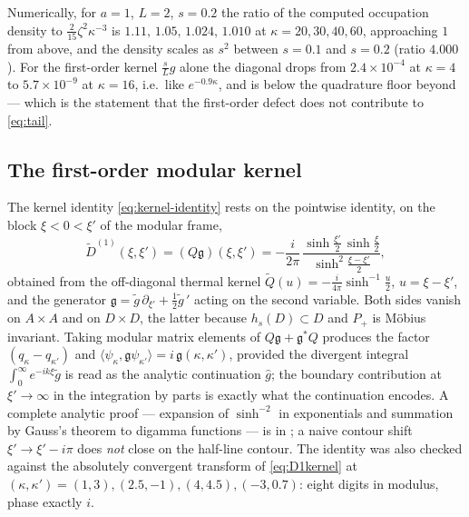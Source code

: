 Numerically, for $a=1$, $L=2$, $s=0.2$ the ratio of the computed occupation
density to $\frac2{15}\zeta^2\kappa^{-3}$ is $1.11,\,1.05,\,1.024,\,1.010$ at
$\kappa=20,30,40,60$, approaching $1$ from above, and the density scales as $s^2$
between $s=0.1$ and $s=0.2$ (ratio $4.000$).  For the first-order kernel
$\frac sLg$ alone the diagonal drops from $2.4\times10^{-4}$ at $\kappa=4$ to
$5.7\times10^{-9}$ at $\kappa=16$, i.e.\ like $e^{-0.9\kappa}$, and is below the
quadrature floor beyond --- which is the statement that the first-order defect does
not contribute to \eqref{eq:tail}.

\subsection{The first-order modular kernel}
\label{app:D1}
The kernel identity \eqref{eq:kernel-identity} rests on the pointwise identity, on
the block $\xi<0<\xi'$ of the modular frame,
\begin{equation}\label{eq:D1kernel}
 \widetilde D^{(1)}(\xi,\xi')=(Q\mathfrak g)(\xi,\xi')
 =-\frac i{2\pi}\,
 \frac{\sinh\frac{\xi'}2\,\sinh\frac\xi2}{\sinh^2\frac{\xi-\xi'}2},
\end{equation}
obtained from the off-diagonal thermal kernel
$\widetilde Q(u)=-\frac i{4\pi}\sinh^{-1}\frac u2$, $u=\xi-\xi'$, and the
generator $\mathfrak g=\widetilde g\,\partial_{\xi'}+\frac12\widetilde g\,'$
acting on the second variable.  Both sides vanish on $A\times A$ and on
$D\times D$, the latter because $h_s(D)\subset D$ and $P_+$ is M\"obius invariant.
Taking modular matrix elements of $Q\mathfrak g+\mathfrak g^*Q$ produces the
factor $(q_\kappa-q_{\kappa'})$ and
$\langle\psi_\kappa,\mathfrak g\psi_{\kappa'}\rangle=i\,\mathfrak g(\kappa,\kappa')$,
provided the divergent integral $\int_0^\infty e^{-ik\xi}\widetilde g$ is read as
the analytic continuation $\widehat g$; the boundary contribution at
$\xi'\to\infty$ in the integration by parts is exactly what the continuation
encodes.  A complete analytic proof --- expansion of $\sinh^{-2}$ in exponentials
and summation by Gauss's theorem to digamma functions --- is in \cite{RigorKI}; a
naive contour shift $\xi'\to\xi'-i\pi$ does \emph{not} close on the half-line
contour.  The identity was also checked against the absolutely convergent
transform of \eqref{eq:D1kernel} at $(\kappa,\kappa')=(1,3),(2.5,-1),(4,4.5),
(-3,0.7)$: eight digits in modulus, phase exactly $i$.
